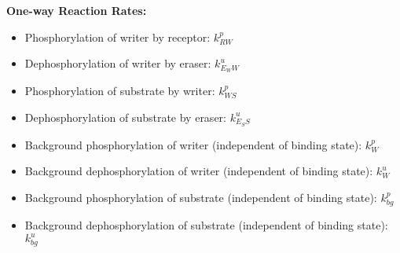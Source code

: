\documentclass[aps,onecolumn,superscriptaddress,notitlepage]{revtex4-1}
\begin{document}
\textbf{One-way Reaction Rates:}
\begin{itemize}
\item Phosphorylation of writer by receptor: $k_{RW}^p$
\item Dephosphorylation of writer by eraser: $k_{E_WW}^u$
\item Phosphorylation of substrate by writer: $k_{WS}^p$
\item Dephosphorylation of substrate by eraser: $k_{E_SS}^u$
\item Background phosphorylation of writer (independent of binding state): $k_W^p$
\item Background dephosphorylation of writer (independent of binding state): $k_W^u$
\item Background phosphorylation of substrate (independent of binding state): $k_{bg}^p$
\item Background dephosphorylation of substrate (independent of binding state): $k_{bg}^u$
\end{itemize}
\end{document}
